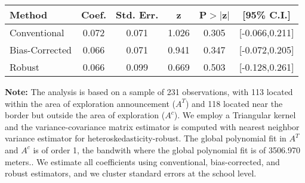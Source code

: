 \begin{table}[htbp]\centering
 \footnotesize 
\begin{tabular}{lccccc}
\hline\hline
Method & Coef. & Std. Err. & z & P$>|$z$|$ & [95\% C.I.] \\ 
\hline \hline  
Conventional & 0.072 & 0.071 & 1.026 & 0.305 & [-0.066,0.211] \\ 
 Bias-Corrected & 0.066 & 0.071 & 0.941 & 0.347 & [-0.072,0.205] \\ 
Robust & 0.066 & 0.099 & 0.669 & 0.503 & [-0.128,0.261] \\ 
  \hline\hline
\end{tabular}
\label{table:rd}
\begin{tablenotes} 
  \justifying \tiny \textbf{Note: }    
   The analysis is based on a sample of 231 observations, with 113 located within the area of exploration announcement ($A^{T}$) and 118 located near the border but outside the area of exploration  ($A^{c}$). 
           We employ a Triangular kernel and the variance-covariance matrix estimator is computed with nearest neighbor variance estimator for heteroskedasticity-robust. The global polynomial fit in  $A^{T}$ and $A^{c}$ is of order 1, the bandwith where the global polynomial fit is of 3506.970 meters.. We estimate all coefficients using conventional, bias-corrected, and robust estimators, and we cluster standard errors at the school level. \end{tablenotes} 
 \end{table} 
